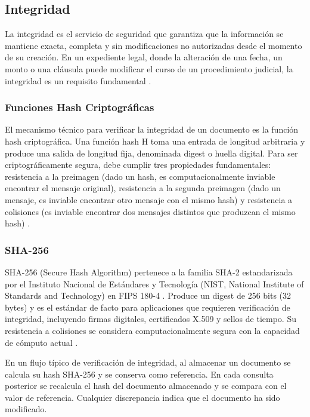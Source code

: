 \subsection{Integridad}\label{sec:integridad}

La integridad es el servicio de seguridad que garantiza que la información se mantiene exacta, completa y sin modificaciones no autorizadas desde el momento de su creación. En un expediente legal, donde la alteración de una fecha, un monto o una cláusula puede modificar el curso de un procedimiento judicial, la integridad es un requisito fundamental \cite{stallings2017}.

\subsubsection{Funciones Hash Criptográficas}

El mecanismo técnico para verificar la integridad de un documento es la función hash criptográfica. Una función hash H toma una entrada de longitud arbitraria y produce una salida de longitud fija, denominada digest o huella digital. Para ser criptográficamente segura, debe cumplir tres propiedades fundamentales: resistencia a la preimagen (dado un hash, es computacionalmente inviable encontrar el mensaje original), resistencia a la segunda preimagen (dado un mensaje, es inviable encontrar otro mensaje con el mismo hash) y resistencia a colisiones (es inviable encontrar dos mensajes distintos que produzcan el mismo hash) \cite{paar2010,nist2015fips1804}.

\subsubsection{SHA-256}

SHA-256 (Secure Hash Algorithm) pertenece a la familia SHA-2 estandarizada por el Instituto Nacional de Estándares y Tecnología (NIST, National Institute of Standards and Technology) en FIPS 180-4 \cite{nist2015fips1804}. Produce un digest de 256 bits (32 bytes) y es el estándar de facto para aplicaciones que requieren verificación de integridad, incluyendo firmas digitales, certificados X.509 y sellos de tiempo. Su resistencia a colisiones se considera computacionalmente segura con la capacidad de cómputo actual \cite{menezes1996}.

En un flujo típico de verificación de integridad, al almacenar un documento se calcula su hash SHA-256 y se conserva como referencia. En cada consulta posterior se recalcula el hash del documento almacenado y se compara con el valor de referencia. Cualquier discrepancia indica que el documento ha sido modificado.


